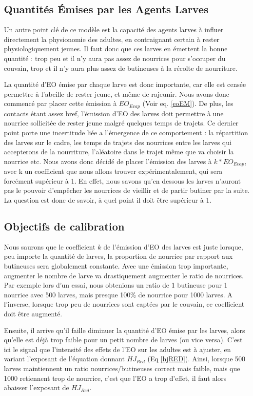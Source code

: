 	
	
	\subsection{Quantités Émises par les Agents Larves}
	Un autre point clé de ce modèle est la capacité des agents larves à influer directement la physionomie des adultes, en contraignant certain à rester physiologiquement jeunes. Il faut donc  que ces larves en émettent la bonne quantité : trop peu et il n'y aura pas assez de nourrices pour s'occuper du couvain, trop et il n'y aura plus assez de butineuses à la récolte de nourriture.
	
	La quantité d'EO émise par chaque larve est donc importante, car elle est censée permettre à l'abeille de rester jeune, et même de rajeunir. Nous avons donc commencé par placer cette émission à $EO_{Evap}$ (Voir eq. \ref{eoEM}). De plus, les contacts étant assez bref, l'émission d'EO des larves doit permettre à une nourrice sollicitée de rester jeune malgré quelques temps de trajets. Ce dernier point porte une incertitude liée a l'émergence de ce comportement : la répartition des larves sur le cadre, les temps de trajets des nourrices entre les larves qui accepterons de la nourriture, l'aléatoire dans le trajet même que va choisir la nourrice etc. Nous avons donc décidé de placer l'émission des larves à $k * EO_{Evap}$, avec k un coefficient que nous allons trouver expérimentalement, qui sera forcément supérieur à 1. En effet, nous savons qu'en dessous les larves n'auront pas le pouvoir d'empêcher les nourrices de vieillir et de partir butiner par la suite. La question est donc de savoir, à quel point il doit être supérieur à 1.
	
	\subsection{Objectifs de calibration}
	Nous saurons que le coefficient $k$ de l'émission d'EO des larves est juste lorsque, peu importe la quantité de larves, la proportion de nourrice par rapport aux butineuses sera globalement constante. Avec une émission trop importante, augmenter le nombre de larve va drastiquement augmenter le ratio de nourrices. Par exemple lors d'un essai, nous obtenions un ratio de 1 butineuse pour 1 nourrice avec 500 larves, mais presque 100\% de nourrice pour 1000 larves. A l'inverse, lorsque trop peu de nourrices sont captées par le couvain, ce coefficient doit être augmenté.
	
	Ensuite, il arrive qu'il faille diminuer la quantité d'EO émise par les larves, alors qu'elle est déjà trop faible pour un petit nombre de larves (ou vice versa). C'est ici le signal que l'intensité des effets de l'EO sur les adultes est à ajuster, en variant l'exposant de l'équation donnant $HJ_{Red}$ (Eq \ref{hjRED}). Ainsi, lorsque 500 larves maintiennent un ratio nourrices/butineuses correct mais faible, mais que 1000 retiennent trop de nourrice, c'est que l'EO a trop d'effet, il faut alors abaisser l'exposant de $HJ_{Red}$. 
	
